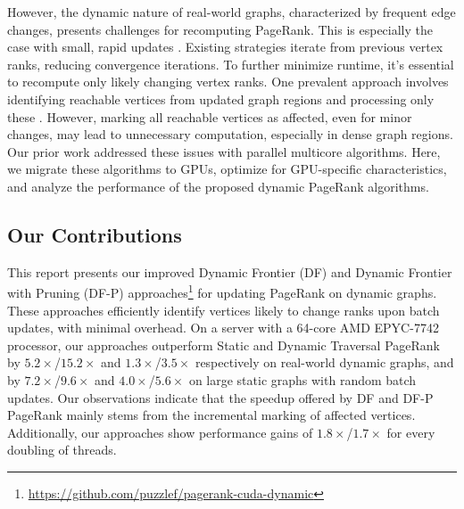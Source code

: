 However, the dynamic nature of real-world graphs, characterized by frequent edge changes, presents challenges for recomputing PageRank. This is especially the case with small, rapid updates \cite{agarwal2012real, barros2021survey}. Existing strategies iterate from previous vertex ranks, reducing convergence iterations. To further minimize runtime, it's essential to recompute only likely changing vertex ranks. One prevalent approach involves identifying reachable vertices from updated graph regions and processing only these \cite{rank-desikan05, kim2015incremental, rank-giri20, sahu2022dynamic}. However, marking all reachable vertices as affected, even for minor changes, may lead to unnecessary computation, especially in dense graph regions. Our prior work \cite{sahu2024df} addressed these issues with parallel multicore algorithms. Here, we migrate these algorithms to GPUs, optimize for GPU-specific characteristics, and analyze the performance of the proposed dynamic PageRank algorithms.




\subsection{Our Contributions}

This report presents our improved Dynamic Frontier (DF) and Dynamic Frontier with Pruning (DF-P) approaches\footnote{\url{https://github.com/puzzlef/pagerank-cuda-dynamic}} for updating PageRank on dynamic graphs. These approaches efficiently identify vertices likely to change ranks upon batch updates, with minimal overhead. On a server with a 64-core AMD EPYC-7742 processor, our approaches outperform Static and Dynamic Traversal PageRank by $5.2\times$/$15.2\times$ and $1.3\times$/$3.5\times$ respectively on real-world dynamic graphs, and by $7.2\times$/$9.6\times$ and $4.0\times$/$5.6\times$ on large static graphs with random batch updates. Our observations indicate that the speedup offered by DF and DF-P PageRank mainly stems from the incremental marking of affected vertices. Additionally, our approaches show performance gains of $1.8\times$/$1.7\times$ for every doubling of threads.




